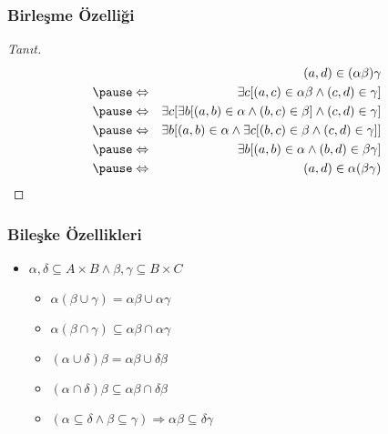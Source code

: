 \documentclass[dvipsnames]{beamer}
\theoremstyle{definition}
\theoremstyle{example}
\theoremstyle{plain}
\begin{document}
\begin{frame}
  \frametitle{Birleşme Özelliği}

  \begin{proof}[Tanıt]
    \begin{eqnarray*}
      &                 & (a,d) \in (\alpha \beta)\gamma\\\pause
      & \Leftrightarrow & \exists c [(a,c) \in \alpha \beta
                              \wedge (c,d) \in \gamma]\\\pause
      & \Leftrightarrow & \exists c [\exists b [(a,b) \in \alpha
                                         \wedge (b,c) \in \beta]
                                         \wedge (c,d) \in \gamma]\\\pause
      & \Leftrightarrow & \exists b [(a,b) \in \alpha
                              \wedge \exists c [(b,c) \in \beta
                              \wedge (c,d) \in \gamma]]\\\pause
      & \Leftrightarrow & \exists b [(a,b) \in \alpha
                              \wedge (b,d) \in \beta \gamma]\\\pause
      & \Leftrightarrow & (a,d) \in \alpha (\beta \gamma)
    \end{eqnarray*}
  \end{proof}
\end{frame}

\begin{frame}
  \frametitle{Bileşke Özellikleri}

  \begin{itemize}
    \item $\alpha , \delta \subseteq A \times B \wedge
           \beta , \gamma \subseteq B \times C$

    \begin{itemize}
      \item $\alpha (\beta \cup \gamma) = \alpha \beta \cup \alpha \gamma$

      \pause
      \item $\alpha (\beta \cap \gamma)
        \subseteq \alpha \beta \cap \alpha \gamma$

      \pause
      \item $(\alpha \cup \delta) \beta = \alpha \beta \cup \delta \beta$

      \pause
      \item $(\alpha \cap \delta) \beta
        \subseteq \alpha \beta \cap \delta \beta$

      \pause
      \item $(\alpha \subseteq \delta \wedge \beta \subseteq \gamma)
        \Rightarrow \alpha \beta \subseteq \delta \gamma$
    \end{itemize}
  \end{itemize}
\end{frame}
\end{document}
